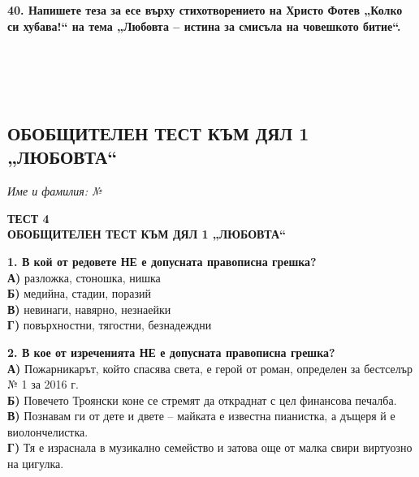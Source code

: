 \documentclass[12pt,a4paper]{article}
\begin{document}
\vspace{0.6cm}

\noindent
\textbf{40. Напишете теза за есе върху стихотворението на Христо Фотев „Колко си хубава!“ на тема „Любовта – истина за смисъла на човешкото битие“.} \\
\noindent
\makebox[\textwidth]{\dotfill} \\
\makebox[\textwidth]{\dotfill} \\
\makebox[\textwidth]{\dotfill} \\
\makebox[\textwidth]{\dotfill} \\
\makebox[\textwidth]{\dotfill}
\newpage

\subsection{ОБОБЩИТЕЛЕН ТЕСТ КЪМ ДЯЛ 1 „ЛЮБОВТА“}
\noindent
\textit{Име и фамилия:} \dotfill \textit{№} \makebox[2cm]{\dotfill}

\vspace{0.6cm}

\begin{center}
{\large\bfseries ТЕСТ 4} \\
{\bfseries ОБОБЩИТЕЛЕН ТЕСТ КЪМ ДЯЛ 1 „ЛЮБОВТА“}
\end{center}

\vspace{0.5cm}

\noindent
\textbf{1. В кой от редовете \textbf{НЕ} е допусната правописна грешка?} \\
\textbf{А)} разложка, стоношка, нишка \\
\textbf{Б)} медийна, стадии, поразий \\
\textbf{В)} невинаги, навярно, незнаейки \\
\textbf{Г)} повърхностни, тягостни, безнадеждни

\vspace{0.6cm}

\noindent
\textbf{2. В кое от изреченията \textbf{НЕ} е допусната правописна грешка?} \\
\textbf{А)} Пожарникарът, който спасява света, е герой от роман, определен за бестселър № 1 за 2016 г. \\
\textbf{Б)} Повечето Троянски коне се стремят да откраднат с цел финансова печалба. \\
\textbf{В)} Познавам ги от дете и двете – майката е известна пианистка, а дъщеря й е виолончелистка. \\
\textbf{Г)} Тя е израснала в музикално семейство и затова още от малка свири виртуозно на цигулка.
\end{document}
